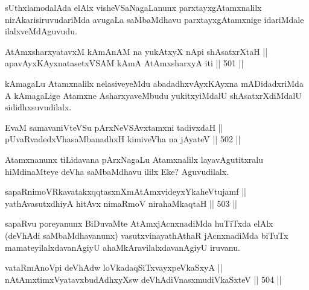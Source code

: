 \begin{artha}
sUthxlamodalAda elAlx visheVSaNagaLanunx parxtayxgAtamxnalilx
nirAkarisiruvudariMda avugaLa saMbaMdhavu parxtayxgAtamxnige
idariMdale ilalxveMdAguvudu.
\end{artha}


\begin{shl}
AtAmxsharxyatavxM kAmAnAM na yukAtxyX nApi shAsatxrXtaH || \\
apavAyxKAyxnatasetxVSAM kAmA AtAmxsharxyA iti \hfill || 501 ||  
\end{shl}

\begin{artha}
kAmagaLu Atamxnalilx nelasiveyeMdu abadadhxvAyxKAyxna mADidadxriMda A
kAmagaLige Atamxne AsharxyaveMbudu yukitxyiMdalU shAsatxrXdiMdalU sididhxsuvudilalx.
\end{artha}


\begin{shl}
EvaM samavaniVteVSu pArxNeVSAvxtamxni tadivxdaH ||  \\
pUvaRvadedxVhasaMbanadhxH kimiveVha na jAyateV \hfill || 502 ||  
\end{shl}

\begin{artha}
Atamxnanunx tiLidavana pArxNagaLu Atamxnalilx layavAgutitxralu
hiMdinaMteye deVha saMbaMdhavu ililx Eke? Aguvudilalx.
\end{artha}


\begin{shl}
sapaRnimoVRkavatakxqqtasxnXmAtAmxvideyxYkaheVtujamf || \\
yathAvasutxdhiyA hitAvx nimaRmoV nirahaMkaqtaH \hfill || 503 ||  
\end{shl}

\begin{artha}
sapaRvu poreyanunx BiDuvaMte AtAmxjAcnxnadiMda huTiTxda elAlx (deVhAdi saMbaMdhavanunx) vasutxvinayathAthaR jAcnxnadiMda biTuTx mamateyilalxdavanAgiyU ahaMkAravilalxdavanAgiyU iruvanu.
\end{artha}


\begin{shl}
vataRmAnoV\s pi deVhAdw loVkadaqSiTxvayxpeVkaSxyA ||  \\
nA\s \s tAmx\s \s timxVyatavxbudAdhxyX\s sw deVhAdiVnasxmudiVkaSxteV \hfill || 504 || 
\end{shl}

